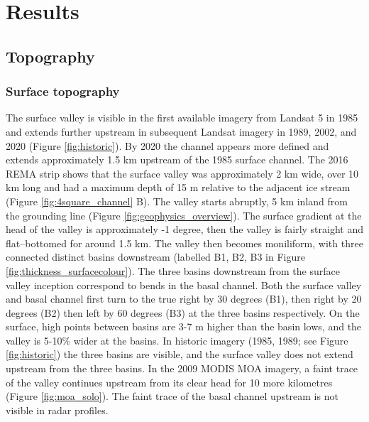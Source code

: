 
\newpage

\section{Results} \label{sec:results}

\subsection{Topography} \label{sec:topography}

\subsubsection{Surface topography} \label{sec:surfacetopog}
The surface valley is visible in the first available imagery from Landsat 5 in 1985 and extends further upstream in subsequent Landsat imagery in 1989, 2002, and 2020 (Figure \ref{fig:historic}). By 2020 the channel appears more defined and extends approximately 1.5 km upstream of the 1985 surface channel. The 2016 REMA strip shows that the surface valley was approximately 2 km wide, over 10 km long and had a maximum depth of 15 m relative to the adjacent ice stream (Figure \ref{fig:4square_channel} B). The valley starts abruptly, 5 km inland from the \cite{depoorter2013amii} grounding line (Figure \ref{fig:geophysics_overview}). The surface gradient at the head of the valley is approximately -1 degree, then the valley is fairly straight and flat--bottomed for around 1.5 km. The valley then becomes moniliform, with three connected distinct basins downstream (labelled B1, B2, B3 in Figure \ref{fig:thickness_surfacecolour}).
The three basins downstream from the surface valley inception correspond to bends in the basal channel. Both the surface valley and basal channel first turn to the true right by 30 degrees (B1), then right by 20 degrees (B2) then left by 60 degrees (B3) at the three basins respectively. On the surface, high points between basins are 3-7 m higher than the basin lows, and the valley is 5-10\% wider at the basins.
In historic imagery (1985, 1989; see Figure \ref{fig:historic}) the three basins are visible, and the surface valley does not extend upstream from the three basins. 
In the 2009 MODIS MOA imagery, a faint trace of the valley continues upstream from its clear head for 10 more kilometres (Figure \ref{fig:moa_solo}). The faint trace of the basal channel upstream is not visible in radar profiles. 

